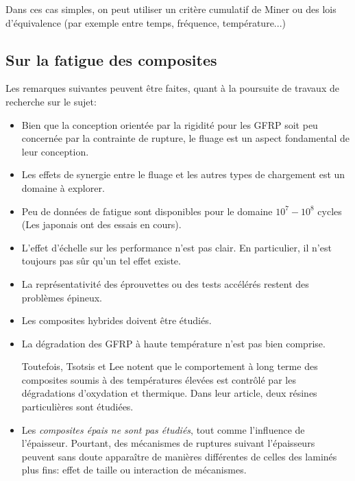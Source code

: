 \medskip
Dans ces cas simples, on peut utiliser un critère cumulatif de Miner ou des lois d'équivalence (par
exemple entre temps, fréquence, température...)



\medskip
\subsection{Sur la fatigue des composites}

Les remarques suivantes peuvent être faites, quant à la poursuite de
travaux de recherche sur le sujet:
\begin{itemize}
   \item Bien que la conception orientée par la rigidité pour les GFRP
         soit peu concernée par la contrainte de rupture, le fluage
         est un aspect fondamental de leur conception.
   \item Les effets de synergie entre le fluage et les autres types
         de chargement est un domaine à explorer.
   \item Peu de données de fatigue sont disponibles pour le domaine
         $10^7-10^8$ cycles (Les japonais ont des essais en cours).
   \item L'effet d'échelle sur les performance n'est pas clair.
         En particulier, il n'est toujours pas sûr qu'un tel effet
         existe.
   \item La représentativité des éprouvettes ou des tests accélérés
         restent des problèmes épineux.
   \item Les composites hybrides doivent être étudiés.
   \item La dégradation des GFRP à haute température n'est pas
         bien comprise.

         Toutefois, Tsotsis et
	 Lee notent que le
         comportement à long terme des composites soumis à des
         températures élevées
         est contrôlé par les dégradations d'oxydation et thermique.
         Dans leur article, deux résines particulières sont étudiées.

   \item Les {\em composites épais ne sont pas étudiés}, tout comme
         l'influence de l'épaisseur.
         Pourtant, des mécanismes de ruptures suivant l'épaisseurs peuvent
         sans doute apparaître de manières différentes de celles des
         laminés plus fins: effet de taille ou interaction de mécanismes.
\end{itemize}
